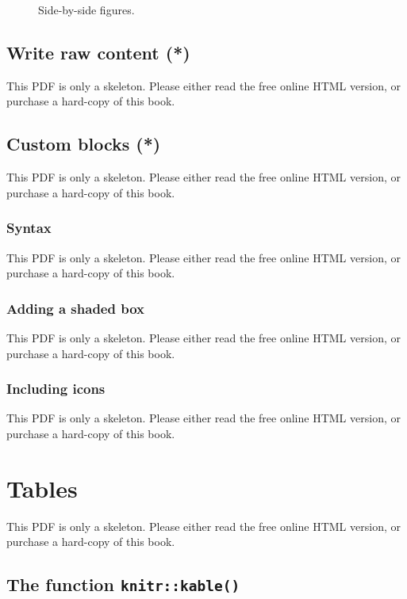 \documentclass[
  11pt,
]{krantz}
\begin{document}
\begin{figure}\caption{Side-by-side figures.}\end{figure}

\section{Write raw content (*)}\label{raw-content}

This PDF is only a skeleton. Please either read the free online HTML version, or purchase a hard-copy of this book.

\section{Custom blocks (*)}\label{custom-blocks}

This PDF is only a skeleton. Please either read the free online HTML version, or purchase a hard-copy of this book.

\subsection{Syntax}\label{block-syntax}

This PDF is only a skeleton. Please either read the free online HTML version, or purchase a hard-copy of this book.

\subsection{Adding a shaded box}\label{block-shaded}

This PDF is only a skeleton. Please either read the free online HTML version, or purchase a hard-copy of this book.

\subsection{Including icons}\label{block-image}

This PDF is only a skeleton. Please either read the free online HTML version, or purchase a hard-copy of this book.

\chapter{Tables}\label{tables}

This PDF is only a skeleton. Please either read the free online HTML version, or purchase a hard-copy of this book.

\section{\texorpdfstring{The function \texttt{knitr::kable()}}{The function knitr::kable()}}\label{kable}
\end{document}
